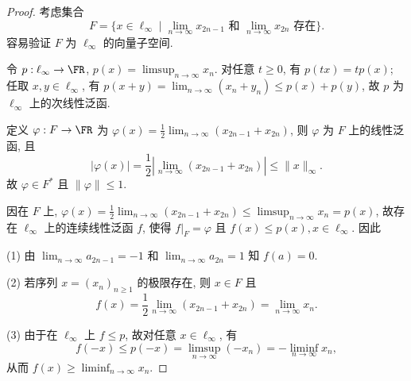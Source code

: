 \documentclass{mathexercise}
\begin{document}
\begin{proof}
    考虑集合
    \[F=\{x\in\ell_{\infty}\mid \lim_{n\to\infty}x_{2n-1}\text{\ 和\ }\lim_{n\to\infty}x_{2n}\text{\ 存在}\}.\]
    容易验证 $F$ 为 $\ell_{\infty}$ 的向量子空间.

    令 $p:\ell_{\infty}\to\FR$, $p(x)=\limsup_{n\to\infty}x_n$.
    对任意 $t\geq 0$, 有 $p(tx)=tp(x)$; 任取 $x,y\in\ell_{\infty}$,
    有 $p(x+y)=\lim_{n\to\infty}(x_n+y_n)\leq p(x)+p(y)$,
    故 $p$ 为 $\ell_{\infty}$ 上的次线性泛函.

    定义 $\varphi: F\to\FR$ 为 $\varphi(x)=\frac{1}{2}\lim_{n\to\infty}(x_{2n-1}+x_{2n})$,
    则 $\varphi$ 为 $F$ 上的线性泛函, 且
    \[|\varphi(x)|=\frac{1}{2}\left|\lim_{n\to\infty}(x_{2n-1}+x_{2n})\right|\leq\|x\|_{\infty}.\]
    故 $\varphi\in F^*$ 且 $\|\varphi\|\leq 1$.

    因在 $F$ 上, $\varphi(x)=\frac{1}{2}\lim_{n\to\infty}(x_{2n-1}+x_{2n})\leq\limsup_{n\to\infty}x_n=p(x)$,
    故存在 $\ell_{\infty}$ 上的连续线性泛函 $f$, 使得 $f|_F=\varphi$ 且 $f(x)\leq p(x),x\in\ell_{\infty}$. 因此

    (1) 由 $\lim_{n\to\infty}a_{2n-1}=-1$ 和 $\lim_{n\to\infty}a_{2n}=1$ 知 $f(a)=0$.

    (2) 若序列 $x=(x_n)_{n\geq 1}$ 的极限存在, 则 $x\in F$ 且
    \[f(x)=\frac{1}{2}\lim_{n\to\infty}(x_{2n-1}+x_{2n})=\lim_{n\to\infty}x_n.\]

    (3) 由于在 $\ell_{\infty}$ 上 $f\leq p$, 故对任意 $x\in\ell_{\infty}$, 有
    \[f(-x)\leq p(-x)=\limsup_{n\to\infty}(-x_n)=-\liminf_{n\to\infty}x_n,\]
    从而 $f(x)\geq\liminf_{n\to\infty}x_n$.
\end{proof}
\end{document}
